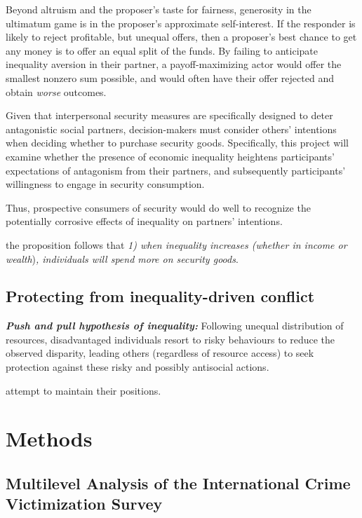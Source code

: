 \documentclass[
  english,
  man]{apa6}
\begin{document}
Beyond altruism and the proposer's taste for fairness, generosity in the ultimatum game is in the proposer's approximate self-interest. If the responder is likely to reject profitable, but unequal offers, then a proposer's best chance to get any money is to offer an equal split of the funds. By failing to anticipate inequality aversion in their partner, a payoff-maximizing actor would offer the smallest nonzero sum possible, and would often have their offer rejected and obtain \emph{worse} outcomes.

Given that interpersonal security measures are specifically designed to deter antagonistic social partners, decision-makers must consider others' intentions when deciding whether to purchase security goods. Specifically, this project will examine whether the presence of economic inequality heightens participants' expectations of antagonism from their partners, and subsequently participants' willingness to engage in security consumption.

Thus, prospective consumers of security would do well to recognize the potentially corrosive effects of inequality on partners' intentions.

the proposition follows that \emph{1) when inequality increases (whether in income or wealth})\emph{, individuals will spend more on security goods}.

\hypertarget{protecting-from-inequality-driven-conflict}{%
\subsection{Protecting from inequality-driven conflict}\label{protecting-from-inequality-driven-conflict}}

\textbf{\emph{Push and pull hypothesis of inequality:}} Following unequal distribution of resources, disadvantaged individuals resort to risky behaviours to reduce the observed disparity, leading others (regardless of resource access) to seek protection against these risky and possibly antisocial actions.

attempt to maintain their positions.

\hypertarget{methods}{%
\section{Methods}\label{methods}}

\hypertarget{multilevel-analysis-of-the-international-crime-victimization-survey}{%
\subsection{Multilevel Analysis of the International Crime Victimization Survey}\label{multilevel-analysis-of-the-international-crime-victimization-survey}}
\end{document}
